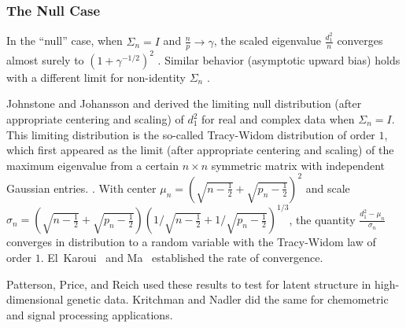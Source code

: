 \documentclass{eoeauth}
\begin{document}
\subsubsection{The Null Case}

In the ``null'' case, when $\Sigma_n = I$ and $\tfrac{n}{p} \to \gamma$,
the scaled eigenvalue $\frac{d_1^2}{n}$ converges almost surely to
$(1 + \gamma^{-1/2})^2$ \cite{geman1980ltn,jonsson1983ole}.  Similar
behavior (asymptotic upward bias) holds with a different limit for
non-identity $\Sigma_n$
\cite{silverstein1984ole,yin1988lle,bai1988nle}. 

Johnstone \cite{johnstone2001dle} and Johansson \cite{johansson2000sfa}
and derived the limiting null distribution (after appropriate
centering and scaling) of $d_1^2$ for real and complex data when
$\Sigma_n = I$.  This limiting distribution is the so-called
Tracy-Widom distribution of order $1$, which first appeared as the limit
(after appropriate centering and scaling) of the maximum eigenvalue
from a certain $n \times n$ symmetric matrix with independent Gaussian entries.
\cite{tracy1994lsd, tracy1996oas}.
With center
$\mu_n = \left(\sqrt{n-\tfrac{1}{2}} + \sqrt{p_n - \tfrac{1}{2}}\right)^2$ and scale
$\sigma_n = \left(\sqrt{n-\tfrac{1}{2}} + \sqrt{p_n -
    \tfrac{1}{2}}\right) \left(1/\sqrt{n-\tfrac{1}{2}} + 1/\sqrt{p_n -
    \tfrac{1}{2}}\right)^{1/3}$, 
the quantity
\(
\frac{d^2_1 - \mu_n}{\sigma_n}
\)
converges in distribution to a random variable with the Tracy-Widom
law of order $1$.  El~Karoui~\cite{elkaroui2006mpt} and
Ma~\cite{ma2008atw} established the rate of convergence.



Patterson, Price, and Reich \cite{patterson2006population} used these
results to test for latent structure in high-dimensional genetic
data.  Kritchman and Nadler \cite{kritchman2008determining,kritchman2009non} did the
same for chemometric and signal processing applications.
\end{document}
